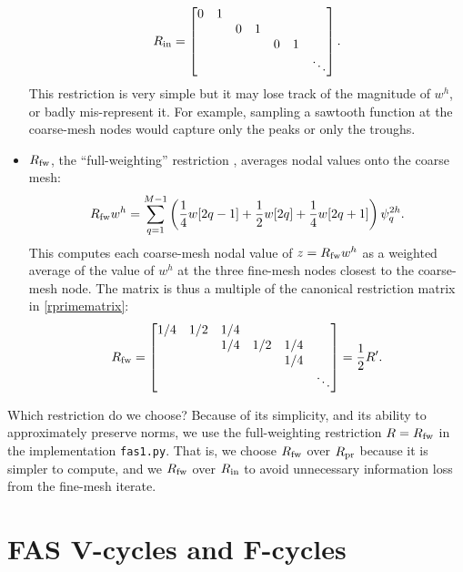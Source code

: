 \documentclass[letterpaper,final,12pt,reqno]{amsart}
\begin{document}
\begin{itemize}
\begin{equation}
R_{\text{in}} = \begin{bmatrix}
0 & 1 &   &   &   &   &\\
  &   & 0 & 1 &   &   & \\
  &   &   &   & 0 & 1 & \\
  &   &   &   &   &   & \ddots
\end{bmatrix}. \label{rinmatrix}
\end{equation}
This restriction is very simple but it may lose track of the magnitude of $w^h$, or badly mis-represent it.  For example, sampling a sawtooth function at the coarse-mesh nodes would capture only the peaks or only the troughs.
\item $R_{\text{fw}}$, the ``full-weighting'' restriction \cite{Briggsetal2000}, averages nodal values onto the coarse mesh:
\begin{equation}
  R_{\text{fw}} w^h = \sum_{q=1}^{M-1} \left(\frac{1}{4} w[2q-1] + \frac{1}{2} w[2q] + \frac{1}{4} w[2q+1]\right) \psi_q^{2h}. \label{rfwdefinition}
\end{equation}
This computes each coarse-mesh nodal value of $z=R_{\text{fw}} w^h$ as a weighted average of the value of $w^h$ at the three fine-mesh nodes closest to the coarse-mesh node.  The matrix is thus a multiple of the canonical restriction matrix in \eqref{rprimematrix}:
\begin{equation}
R_{\text{fw}} = \begin{bmatrix}
1/4 & 1/2 & 1/4 &     &     &  \\
    &     & 1/4 & 1/2 & 1/4 &  \\
    &     &     &     & 1/4 &  \\
    &     &     &     &     & \ddots
\end{bmatrix} = \frac{1}{2} R'. \label{rfwmatrix}
\end{equation}
\end{itemize}

\medskip
Which restriction do we choose?  Because of its simplicity, and its ability to approximately preserve norms, we use the full-weighting restriction $R=R_{\text{fw}}$ in the implementation \texttt{fas1.py}.  That is, we choose $R_{\text{fw}}$ over $R_{\text{pr}}$ because it is simpler to compute, and we $R_{\text{fw}}$ over $R_{\text{in}}$ to avoid unnecessary information loss from the fine-mesh iterate.


\section{FAS V-cycles and F-cycles}
\end{document}
